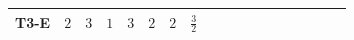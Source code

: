 \documentclass[8pt]{article}
\begin{document}
\begin{landscape}
\begin{longtable}{@{}llcccccc >{\raggedright\arraybackslash}p{0.21\linewidth} >{\raggedright\arraybackslash}p{0.21\linewidth}@{}}
\midrule
T3-E & $2$ & $3$ & $1$ & $3$ & $2$ & $2$ & $\frac{3}{2}$ & \scriptsize\adjustbox{max width=\linewidth}{$\begin{gathered} 6 C_{5} Y_d Y_d^\dagger\end{gathered}$} & \scriptsize\adjustbox{max width=\linewidth}{$\begin{gathered} 6 C_{5} Y_u Y_u^\dagger\end{gathered}$} \\
\midrule
\bottomrule
\end{longtable}
\end{landscape}
\end{document}
